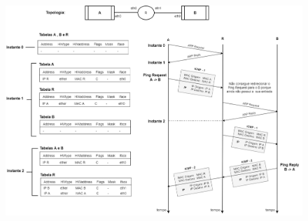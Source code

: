     \begin{figure}[H]
    \centering
    \includegraphics[width=\linewidth]{prints/Questao5/diagramaNOVO.png}
    \end{figure}